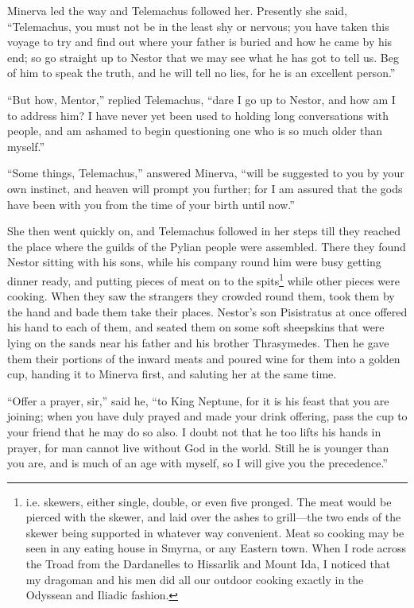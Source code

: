 Minerva led the way and Telemachus followed her. Presently she said,
“Telemachus, you must not be in the least shy or nervous; you have taken this
voyage to try and find out where your father is buried and how he came by his
end; so go straight up to Nestor that we may see what he has got to tell us.
Beg of him to speak the truth, and he will tell no lies, for he is an excellent
person.”

“But how, Mentor,” replied Telemachus, “dare I go up to Nestor, and how am I to
address him? I have never yet been used to holding long conversations with
people, and am ashamed to begin questioning one who is so much older than
myself.”

“Some things, Telemachus,” answered Minerva, “will be suggested to you by your
own instinct, and heaven will prompt you further; for I am assured that the
gods have been with you from the time of your birth until now.”

She then went quickly on, and Telemachus followed in her steps till they
reached the place where the guilds of the Pylian people were assembled. There
they found Nestor sitting with his sons, while his company round him were busy
getting dinner ready, and putting pieces of meat on to the spits\footnote{i.e. skewers, either single, double, or even five pronged. The meat would be
pierced with the skewer, and laid over the ashes to grill—the two ends of the
skewer being supported in whatever way convenient. Meat so cooking may be seen
in any eating house in Smyrna, or any Eastern town. When I rode across the
Troad from the Dardanelles to Hissarlik and Mount Ida, I noticed that my
dragoman and his men did all our outdoor cooking exactly in the Odyssean and
Iliadic fashion.} while other
pieces were cooking. When they saw the strangers they crowded round them, took
them by the hand and bade them take their places. Nestor’s son Pisistratus at
once offered his hand to each of them, and seated them on some soft sheepskins
that were lying on the sands near his father and his brother Thrasymedes. Then
he gave them their portions of the inward meats and poured wine for them into a
golden cup, handing it to Minerva first, and saluting her at the same time.

“Offer a prayer, sir,” said he, “to King Neptune, for it is his feast that you
are joining; when you have duly prayed and made your drink offering, pass the
cup to your friend that he may do so also. I doubt not that he too lifts his
hands in prayer, for man cannot live without God in the world. Still he is
younger than you are, and is much of an age with myself, so I will give you the
precedence.”

